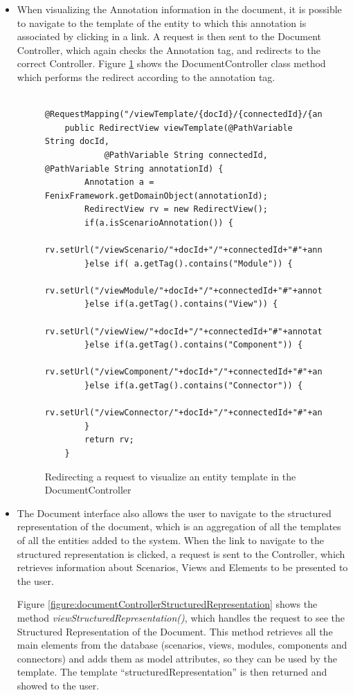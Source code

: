 \documentclass{llncs}
\begin{document}
\begin{itemize}
\item When visualizing the Annotation information in the document, it is possible to navigate to the template of the entity to which this annotation is associated by clicking in a link. A request is then sent to the Document Controller, which again checks the Annotation tag, and redirects to the correct Controller. Figure \ref{figure:documentControllerViewTemplate} shows the DocumentController class method which performs the redirect according to the annotation tag.

\begin{figure}
\lstset{style=customjava}
\begin{lstlisting}
	@RequestMapping("/viewTemplate/{docId}/{connectedId}/{annotationId}")
	public RedirectView viewTemplate(@PathVariable String docId,
			@PathVariable String connectedId, @PathVariable String annotationId) {
		Annotation a = FenixFramework.getDomainObject(annotationId);
		RedirectView rv = new RedirectView();
		if(a.isScenarioAnnotation()) {
			rv.setUrl("/viewScenario/"+docId+"/"+connectedId+"#"+annotationId);
		}else if( a.getTag().contains("Module")) {
			rv.setUrl("/viewModule/"+docId+"/"+connectedId+"#"+annotationId);
		}else if(a.getTag().contains("View")) {
			rv.setUrl("/viewView/"+docId+"/"+connectedId+"#"+annotationId);
		}else if(a.getTag().contains("Component")) {
			rv.setUrl("/viewComponent/"+docId+"/"+connectedId+"#"+annotationId);
		}else if(a.getTag().contains("Connector")) {
			rv.setUrl("/viewConnector/"+docId+"/"+connectedId+"#"+annotationId);
		}
		return rv;
	}	
\end{lstlisting}
\caption{Redirecting a request to visualize an entity template in the DocumentController}
\label{figure:documentControllerViewTemplate}
\end{figure}

\item The Document interface also allows the user to navigate to the structured representation of the document, which is an aggregation of all the templates of all the entities added to the system. When the link to navigate to the structured representation is clicked, a request is sent to the Controller, which retrieves information about Scenarios, Views and Elements to be presented to the user. 

Figure \ref{figure:documentControllerStructuredRepresentation} shows the method \textit{viewStructuredRepresentation()}, which handles the request to see the Structured Representation of the Document. This method retrieves all the main elements from the database (scenarios, views, modules, components and connectors) and adds them as model attributes, so they can be used by the template. The template ``structuredRepresentation'' is then returned and showed to the user.


\end{itemize}
\end{document}
